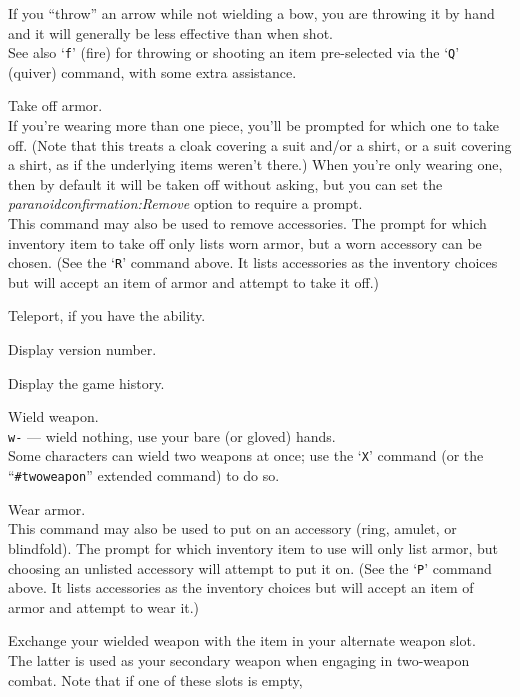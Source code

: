 \documentclass[titlepage]{article}
\begin{document}
\begin{description}[font=\mdseries\ttfamily]
If you ``throw'' an arrow while not wielding a bow, you are throwing
it by hand and it will generally be less effective than when shot.\\
See also `\texttt{f}' (fire) for throwing or shooting an item pre-selected
via the `\texttt{Q}' (quiver) command, with some extra assistance.
\item[T]
Take off armor.\\
If you're wearing more than one piece, you'll be prompted for which
one to take off.  (Note that this treats a cloak covering a suit
and/or a shirt, or a suit covering a shirt, as if the underlying items
weren't there.)
When you're only wearing one, then by default it will
be taken off without asking, but you can set the
\textit{paranoid\textunderscore confirmation:Remove}
option to require a prompt.\\
This command may also be used to remove accessories.  The prompt
for which inventory item to take off only lists worn armor, but a worn
accessory can be chosen.
(See the `\texttt{R}' command above.  It lists accessories as the inventory
choices but will accept an item of armor and attempt to take it off.)
\item[\textasciicircum T]
Teleport, if you have the ability.
\item[v]
Display version number.
\item[V]
Display the game history.
\item[w]
Wield weapon.\\
\texttt{w-} --- wield nothing, use your bare (or gloved) hands.\\
Some characters can wield two weapons at once; use the `\texttt{X}' command
(or the ``\texttt{\#twoweapon}'' extended command) to do so.
\item[W]
Wear armor.\\
This command may also be used to put on an accessory (ring, amulet, or
blindfold).  The prompt for which inventory item to use will only list
armor, but choosing an unlisted accessory will attempt to put it on.
(See the `\texttt{P}' command above.  It lists accessories as the inventory
choices but will accept an item of armor and attempt to wear it.)
\item[x]
Exchange your wielded weapon with the item in your alternate weapon slot.\\
The latter is used as your secondary weapon when engaging in
two-weapon combat.  Note that if one of these slots is empty,

\end{description}
\end{document}
